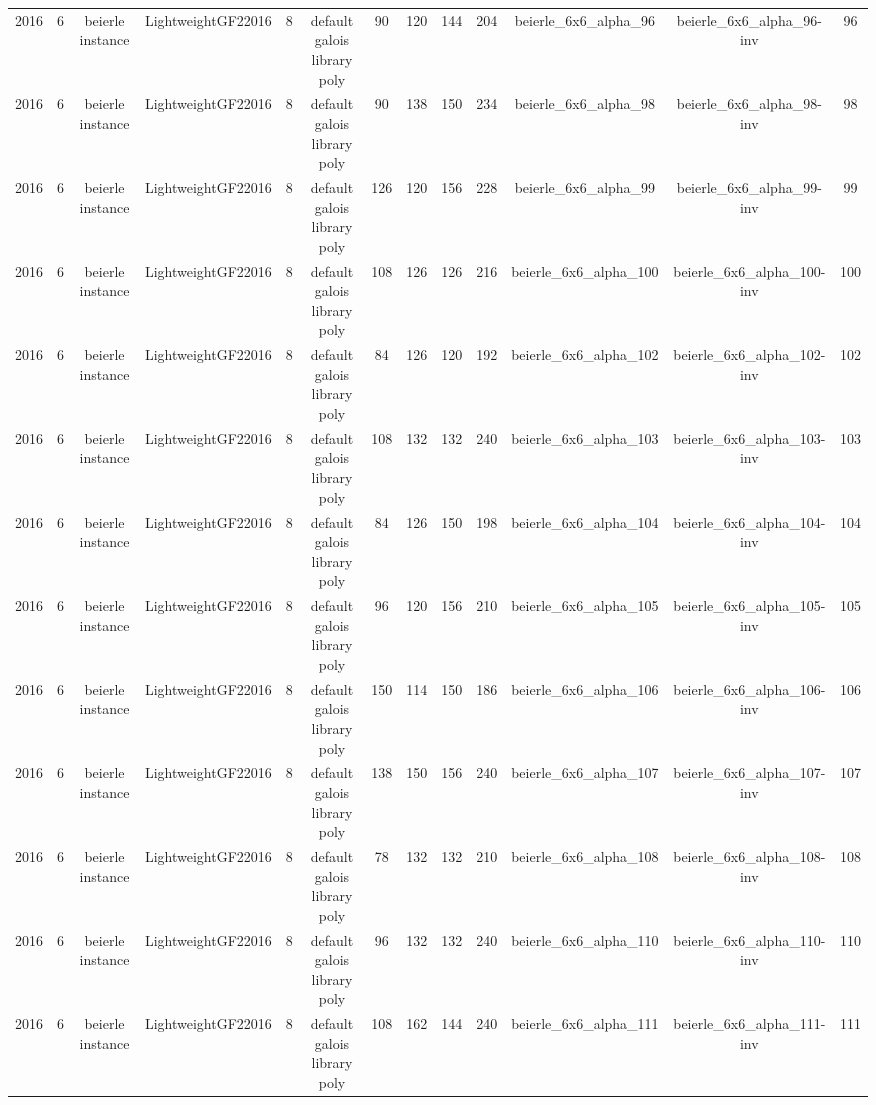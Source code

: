 \begin{tabular}{c c c c c c c c c c c c c}
2016 & 6 & beierle instance & LightweightGF22016 & 8 & default galois library poly & 90 & 120 & 144 & 204 & beierle_6x6_alpha_96 & beierle_6x6_alpha_96-inv & 96 \\
2016 & 6 & beierle instance & LightweightGF22016 & 8 & default galois library poly & 90 & 138 & 150 & 234 & beierle_6x6_alpha_98 & beierle_6x6_alpha_98-inv & 98 \\
2016 & 6 & beierle instance & LightweightGF22016 & 8 & default galois library poly & 126 & 120 & 156 & 228 & beierle_6x6_alpha_99 & beierle_6x6_alpha_99-inv & 99 \\
2016 & 6 & beierle instance & LightweightGF22016 & 8 & default galois library poly & 108 & 126 & 126 & 216 & beierle_6x6_alpha_100 & beierle_6x6_alpha_100-inv & 100 \\
2016 & 6 & beierle instance & LightweightGF22016 & 8 & default galois library poly & 84 & 126 & 120 & 192 & beierle_6x6_alpha_102 & beierle_6x6_alpha_102-inv & 102 \\
2016 & 6 & beierle instance & LightweightGF22016 & 8 & default galois library poly & 108 & 132 & 132 & 240 & beierle_6x6_alpha_103 & beierle_6x6_alpha_103-inv & 103 \\
2016 & 6 & beierle instance & LightweightGF22016 & 8 & default galois library poly & 84 & 126 & 150 & 198 & beierle_6x6_alpha_104 & beierle_6x6_alpha_104-inv & 104 \\
2016 & 6 & beierle instance & LightweightGF22016 & 8 & default galois library poly & 96 & 120 & 156 & 210 & beierle_6x6_alpha_105 & beierle_6x6_alpha_105-inv & 105 \\
2016 & 6 & beierle instance & LightweightGF22016 & 8 & default galois library poly & 150 & 114 & 150 & 186 & beierle_6x6_alpha_106 & beierle_6x6_alpha_106-inv & 106 \\
2016 & 6 & beierle instance & LightweightGF22016 & 8 & default galois library poly & 138 & 150 & 156 & 240 & beierle_6x6_alpha_107 & beierle_6x6_alpha_107-inv & 107 \\
2016 & 6 & beierle instance & LightweightGF22016 & 8 & default galois library poly & 78 & 132 & 132 & 210 & beierle_6x6_alpha_108 & beierle_6x6_alpha_108-inv & 108 \\
2016 & 6 & beierle instance & LightweightGF22016 & 8 & default galois library poly & 96 & 132 & 132 & 240 & beierle_6x6_alpha_110 & beierle_6x6_alpha_110-inv & 110 \\
2016 & 6 & beierle instance & LightweightGF22016 & 8 & default galois library poly & 108 & 162 & 144 & 240 & beierle_6x6_alpha_111 & beierle_6x6_alpha_111-inv & 111 \\

\end{tabular}
